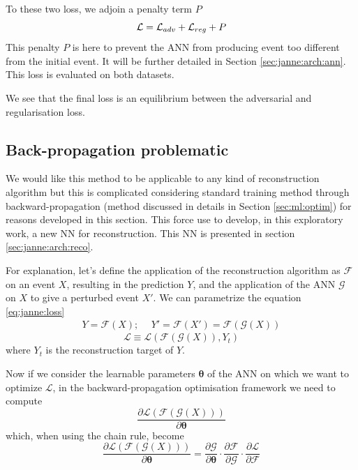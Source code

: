\documentclass[../main.tex]{subfiles}
\begin{document}
To these two loss, we adjoin a penalty term $P$
\begin{equation}
  {\cal L} = {\cal L}_{adv} + {\cal L}_{reg} + P
\end{equation}
This penalty $P$ is here to prevent the ANN from producing event too different from the initial event. It will be further detailed in Section \ref{sec:janne:arch:ann}. This loss is evaluated on both datasets.

We see that the final loss is an equilibrium between the adversarial and regularisation loss.

\subsection{Back-propagation problematic}
\label{sec:janne:back_prop}

We would like this method to be applicable to any kind of reconstruction algorithm but this is complicated considering standard training method through backward-propagation (method discussed in details in Section \ref{sec:ml:optim}) for reasons developed in this section. This force use to develop, in this exploratory work, a new NN for reconstruction. This NN is presented in section
\ref{sec:janne:arch:reco}.

For explanation, let's define the application of the reconstruction algorithm as $\mathcal{F}$ on an event $X$, resulting in the prediction $Y$, and the application of the ANN $\mathcal{G}$ on $X$ to give a perturbed event $X'$. We can parametrize the equation \ref{eq:janne:loss}
\begin{align}
  Y = \mathcal{F}(X); ~~& Y' = \mathcal{F}(X') = \mathcal{F}(\mathcal{G}(X))
\end{align}
\begin{equation}
  \mathcal{L} \equiv \mathcal{L}(\mathcal{F}(\mathcal{G}(X)), Y_t)
\end{equation}
where $Y_t$ is the reconstruction target of $Y$.

Now if we consider the learnable parameters $\bm{\theta}$ of the ANN on which we want to optimize $\mathcal{L}$, in the backward-propagation optimisation framework we need to compute
\begin{equation}
  \frac{\partial \mathcal{L}(\mathcal{F}(\mathcal{G}(X)))}{\partial \bm{\theta}}
\end{equation}
which, when using the chain rule, become
\begin{equation}
  \frac{\partial \mathcal{L}(\mathcal{F}(\mathcal{G}(X)))}{\partial \bm{\theta}} = \frac{\partial \mathcal{G}}{\partial \bm{\theta}} \cdot \frac{\partial \mathcal{F}}{\partial \mathcal{G}} \cdot \frac{\partial \mathcal{L}}{\partial \mathcal{F}}
\end{equation}
\end{document}
